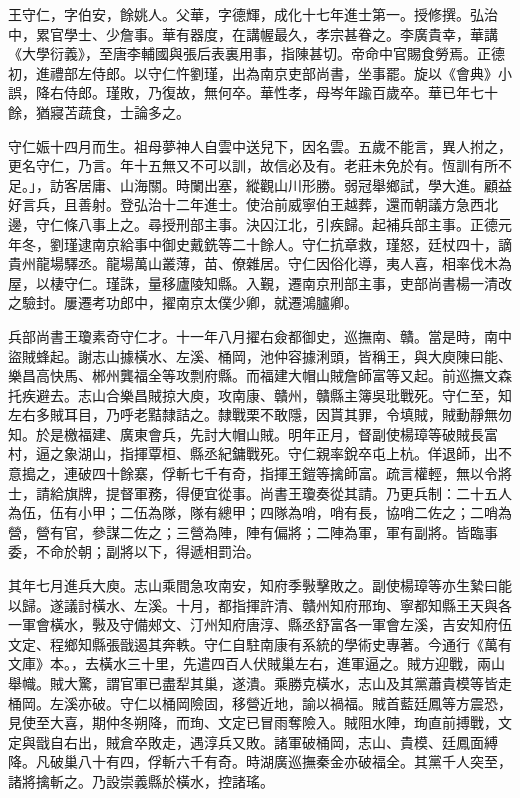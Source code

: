 
\begin{pinyinscope}
王守仁，字伯安，餘姚人。父華，字德輝，成化十七年進士第一。授修撰。弘治中，累官學士、少詹事。華有器度，在講幄最久，孝宗甚眷之。李廣貴幸，華講《大學衍義》，至唐李輔國與張后表裏用事，指陳甚切。帝命中官賜食勞焉。正德初，進禮部左侍郎。以守仁忤劉瑾，出為南京吏部尚書，坐事罷。旋以《會典》小誤，降右侍郎。瑾敗，乃復故，無何卒。華性孝，母岑年踰百歲卒。華已年七十餘，猶寢苫蔬食，士論多之。

守仁娠十四月而生。祖母夢神人自雲中送兒下，因名雲。五歲不能言，異人拊之，更名守仁，乃言。年十五無又不可以訓，故信必及有。老莊未免於有。恆訓有所不足。」，訪客居庸、山海關。時闌出塞，縱觀山川形勝。弱冠舉鄉試，學大進。顧益好言兵，且善射。登弘治十二年進士。使治前威寧伯王越葬，還而朝議方急西北邊，守仁條八事上之。尋授刑部主事。決囚江北，引疾歸。起補兵部主事。正德元年冬，劉瑾逮南京給事中御史戴銑等二十餘人。守仁抗章救，瑾怒，廷杖四十，謫貴州龍場驛丞。龍場萬山叢薄，苗、僚雜居。守仁因俗化導，夷人喜，相率伐木為屋，以棲守仁。瑾誅，量移廬陵知縣。入覲，遷南京刑部主事，吏部尚書楊一清改之驗封。屢遷考功郎中，擢南京太僕少卿，就遷鴻臚卿。

兵部尚書王瓊素奇守仁才。十一年八月擢右僉都御史，巡撫南、贛。當是時，南中盜賊蜂起。謝志山據橫水、左溪、桶岡，池仲容據浰頭，皆稱王，與大庾陳曰能、樂昌高快馬、郴州龔福全等攻剽府縣。而福建大帽山賊詹師富等又起。前巡撫文森托疾避去。志山合樂昌賊掠大庾，攻南康、贛州，贛縣主簿吳玭戰死。守仁至，知左右多賊耳目，乃呼老黠隸詰之。隸戰栗不敢隱，因貰其罪，令填賊，賊動靜無勿知。於是檄福建、廣東會兵，先討大帽山賊。明年正月，督副使楊璋等破賊長富村，逼之象湖山，指揮覃桓、縣丞紀鏞戰死。守仁親率銳卒屯上杭。佯退師，出不意搗之，連破四十餘寨，俘斬七千有奇，指揮王鎧等擒師富。疏言權輕，無以令將士，請給旗牌，提督軍務，得便宜從事。尚書王瓊奏從其請。乃更兵制：二十五人為伍，伍有小甲；二伍為隊，隊有總甲；四隊為哨，哨有長，協哨二佐之；二哨為營，營有官，參謀二佐之；三營為陣，陣有偏將；二陣為軍，軍有副將。皆臨事委，不命於朝；副將以下，得遞相罰治。

其年七月進兵大庾。志山乘間急攻南安，知府季斅擊敗之。副使楊璋等亦生縶曰能以歸。遂議討橫水、左溪。十月，都指揮許清、贛州知府邢珣、寧都知縣王天與各一軍會橫水，斅及守備郟文、汀州知府唐淳、縣丞舒富各一軍會左溪，吉安知府伍文定、程鄉知縣張戩遏其奔軼。守仁自駐南康有系統的學術史專著。今通行《萬有文庫》本。，去橫水三十里，先遣四百人伏賊巢左右，進軍逼之。賊方迎戰，兩山舉幟。賊大驚，謂官軍已盡犁其巢，遂潰。乘勝克橫水，志山及其黨蕭貴模等皆走桶岡。左溪亦破。守仁以桶岡險固，移營近地，諭以禍福。賊首藍廷鳳等方震恐，見使至大喜，期仲冬朔降，而珣、文定已冒雨奪險入。賊阻水陣，珣直前搏戰，文定與戩自右出，賊倉卒敗走，遇淳兵又敗。諸軍破桶岡，志山、貴模、廷鳳面縛降。凡破巢八十有四，俘斬六千有奇。時湖廣巡撫秦金亦破福全。其黨千人突至，諸將擒斬之。乃設崇義縣於橫水，控諸瑤。


\end{pinyinscope}
